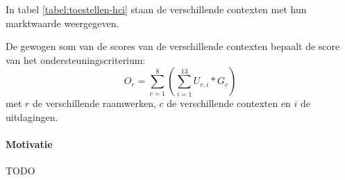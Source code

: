 In tabel \ref{tabel:toestellen-hci} staan de verschillende contexten met hun marktwaarde weergegeven.

De gewogen som van de scores van de verschillende contexten bepaalt de score van het ondersteuningscriterium:
\begin{equation}
  O_r = \sum_{c=1}^{8}{\left(\sum_{i=1}^{13}U_{r,i}*G_c\right)}
  \label{eq:ondersteuning}
\end{equation}
met $r$ de verschillende raamwerken,  $c$ de verschillende contexten en $i$ de uitdagingen. 





\paragraph{Motivatie}
TODO


